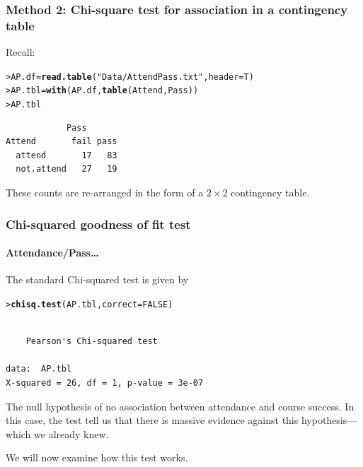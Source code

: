 \documentclass{beamer}\usepackage[]{graphicx}\usepackage[]{xcolor}
\makeatletter
\newcommand{\hlnum}[1]{\textcolor[rgb]{0.686,0.059,0.569}{#1}}%
\newcommand{\hlstr}[1]{\textcolor[rgb]{0.192,0.494,0.8}{#1}}%
\newcommand{\hlstd}[1]{\textcolor[rgb]{0.345,0.345,0.345}{#1}}%
\newcommand{\hlkwb}[1]{\textcolor[rgb]{0.69,0.353,0.396}{#1}}%
\newcommand{\hlkwc}[1]{\textcolor[rgb]{0.333,0.667,0.333}{#1}}%
\newcommand{\hlkwd}[1]{\textcolor[rgb]{0.737,0.353,0.396}{\textbf{#1}}}%
\newenvironment{kframe}{%
 \def\at@end@of@kframe{}%
 \ifinner\ifhmode%
  \def\at@end@of@kframe{\end{minipage}}%
  \begin{minipage}{\columnwidth}%
 \fi\fi%
 \def\FrameCommand##1{\hskip\@totalleftmargin \hskip-\fboxsep
 \colorbox{shadecolor}{##1}\hskip-\fboxsep
     \hskip-\linewidth \hskip-\@totalleftmargin \hskip\columnwidth}%
 \MakeFramed {\advance\hsize-\width
   \@totalleftmargin\z@ \linewidth\hsize
   \@setminipage}}%
 {\par\unskip\endMakeFramed%
 \at@end@of@kframe}
\newenvironment{knitrout}{}{} %
\makeatother
\begin{document}


\begin{frame}[fragile]
\frametitle{Method 2: Chi-square test for association in a contingency table}
Recall:
\bigskip
\begin{knitrout}\scriptsize
{}\color{fgcolor}\begin{kframe}
\begin{alltt}
\hlstd{> }\hlstd{AP.df} \hlkwb{=} \hlkwd{read.table}\hlstd{(}\hlstr{"Data/AttendPass.txt"}\hlstd{,}\hlkwc{header}\hlstd{=T)}
\hlstd{> }\hlstd{AP.tbl}\hlkwb{=}\hlkwd{with}\hlstd{(AP.df,}\hlkwd{table}\hlstd{(Attend,Pass))}
\hlstd{> }\hlstd{AP.tbl}
\end{alltt}
\begin{verbatim}
            Pass
Attend       fail pass
  attend       17   83
  not.attend   27   19
\end{verbatim}
\end{kframe}
\end{knitrout}

These counts are re-arranged in the form of a $2\times 2$ contingency table. 
\end{frame}


\begin{frame}[fragile]
\frametitle{Chi-squared goodness of fit test}
\framesubtitle{Attendance/Pass\ldots}
The standard Chi-squared test is given by
\begin{knitrout}\scriptsize
{}\color{fgcolor}\begin{kframe}
\begin{alltt}
\hlstd{> }\hlkwd{chisq.test}\hlstd{(AP.tbl,}\hlkwc{correct}\hlstd{=}\hlnum{FALSE}\hlstd{)}
\end{alltt}
\begin{verbatim}

	Pearson's Chi-squared test

data:  AP.tbl
X-squared = 26, df = 1, p-value = 3e-07
\end{verbatim}
\end{kframe}
\end{knitrout}
The null hypothesis of no association between attendance and course success. In this case, the test tell us that there is massive evidence against this hypothesis---which we already knew.

\medskip

We will now examine how this test works.

\end{frame}
\end{document}
